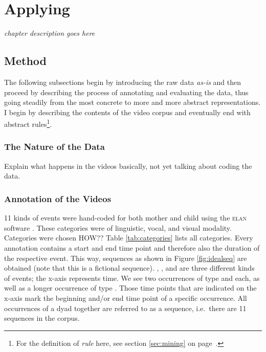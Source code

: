 
\chapter{Applying \fpmupper}
\label{ch:mining}
\emph{chapter description goes here}

\section{Method}
The following subsections begin by introducing the raw data \emph{as-is} and then proceed by describing the process of annotating and evaluating the data, thus going steadily from the most concrete to more and more abstract representations. I begin by describing the contents of the video corpus and eventually end with abstract rules\footnote{For the definition of \emph{rule} here, see section \ref{sec:mining} on page~\pageref{sec:mining}.}.

\subsection{The Nature of the Data}
Explain what happens in the videos basically, not yet talking about coding the data.

\subsection{Annotation of the Videos}
11 kinds of events were hand-coded for both mother and child using the \textsc{elan} software \citep{wittenburg06}. These categories were of linguistic, vocal, and visual modality. Categories were chosen HOW??  %
Table \ref{tab:categories} lists all categories. Every annotation contains a start and end time point and therefore also the duration of the respective event. This way, sequences as shown in Figure \ref{fig:idealseq} are obtained (note that this is a fictional sequence). , , and  are three different kinds of events; the x-axis represents time. We see two occurrences of type  and  each, as well as a longer occurrence of type . Those time points that are indicated on the x-axis mark the beginning and/or end time point of a specific occurrence. All occurrences of a dyad together are referred to as a sequence, i.e.\ there are 11 sequences in the corpus.




